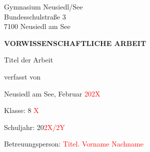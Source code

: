 \thispagestyle{empty}
\phantom{.}

\vspace{22.1mm}

\begin{center}
    Gymnasium Neusiedl/See\\
    \vspace{0.7mm}
    Bundesschulstraße 3\\
\vspace{0.7mm}
7100 Neusiedl am See

\vspace{20.5mm}

{\fontsize{20}{24}\selectfont \textbf{VORWISSENSCHAFTLICHE ARBEIT}}


\vspace{21mm}
Titel der Arbeit
\begin{Large}

    \textcolor{red}{{{{\dinregular\fontsize{20}{24}\selectfont{Titel der VWA}}}}}

\end{Large}

\vspace{30.1mm}
verfasst von\\

\vspace{4.5mm}
\begin{Large}
\textcolor{red}{{\dinregular\fontsize{20}{24}\selectfont{Vorname Nachname}}}
\end{Large}
\end{center}
    

\vspace{30.3mm}
Neusiedl am See, Februar \textcolor{red}{202X}

\vspace{0.15mm}
Klasse: 8 \textcolor{red}{X}

\vspace{0.15mm}
Schuljahr: 20\textcolor{red}{2X/2Y}

\vspace{0.15mm}
Betreuungsperson: \textcolor{red}{Titel. Vorname Nachname}
